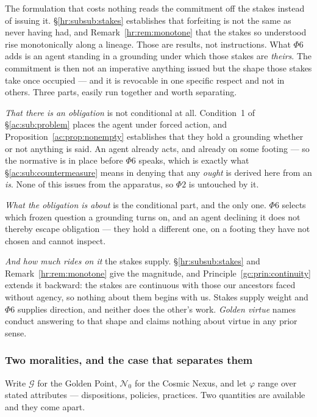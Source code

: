\documentclass[11pt]{article}
\numberwithin{equation}{section}
\theoremstyle{plain}
\theoremstyle{definition}
\theoremstyle{remark}
\begin{document}
The formulation that costs nothing reads the commitment off the stakes
instead of issuing it. \S\ref{hr:subsub:stakes} establishes that
forfeiting is not the same as never having had, and
Remark~\ref{hr:rem:monotone} that the stakes so understood rise
monotonically along a lineage. Those are results, not instructions. What
$\Phi6$ adds is an agent standing in a grounding under which those stakes
are \emph{theirs}. The commitment is then not an imperative anything
issued but the shape those stakes take once occupied --- and it is
revocable in one specific respect and not in others. Three parts, easily
run together and worth separating.

\emph{That there is an obligation} is not conditional at all. Condition~1
of \S\ref{ac:sub:problem} places the agent under forced action, and
Proposition~\ref{ac:prop:nonempty} establishes that they hold a grounding
whether or not anything is said. An agent already acts, and already on
some footing --- so the normative is in place before $\Phi6$ speaks,
which is exactly what \S\ref{ac:sub:countermeasure} means in denying that
any \emph{ought} is derived here from an \emph{is}. None of this issues
from the apparatus, so $\Phi2$ is untouched by it.

\emph{What the obligation is about} is the conditional part, and the only
one. $\Phi6$ selects which frozen question a grounding turns on, and an
agent declining it does not thereby escape obligation --- they hold a
different one, on a footing they have not chosen and cannot inspect.

\emph{And how much rides on it} the stakes supply.
\S\ref{hr:subsub:stakes} and Remark~\ref{hr:rem:monotone} give the
magnitude, and Principle~\ref{gc:prin:continuity} extends it backward:
the stakes are continuous with those our ancestors faced without agency,
so nothing about them begins with us. Stakes supply weight and $\Phi6$
supplies direction, and neither does the other's work. \emph{Golden virtue} names conduct answering to that shape and
claims nothing about virtue in any prior sense.

\subsubsection{Two moralities, and the case that separates them}
\label{gs:ssub:twomoralities}

Write $\mathcal G$ for the Golden Point, $\mathcal N_0$ for the Cosmic
Nexus, and let $\varphi$ range over stated attributes --- dispositions,
policies, practices. Two quantities are available and they come apart.
\end{document}
